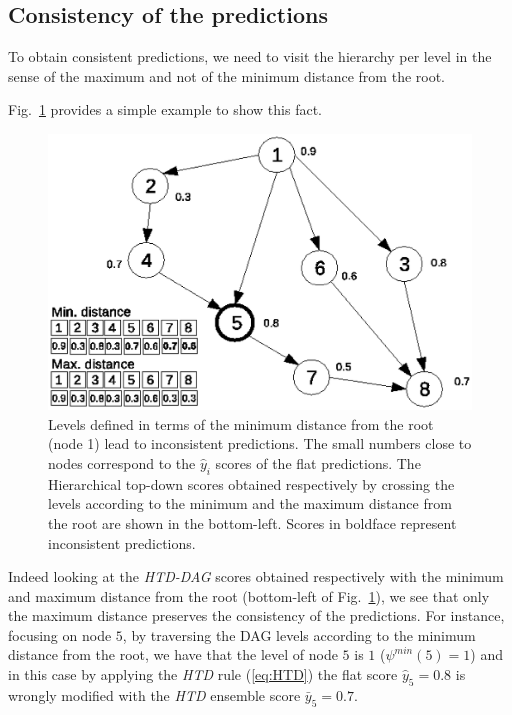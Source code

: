\documentclass{bioinfo}
\begin{document}
\begin{methods}
\subsection{Consistency of the predictions}
\label{sub:consistency}
To obtain consistent predictions, we need to visit the hierarchy per level in the sense of the maximum and not of the minimum distance from the root.

Fig.~\ref{fig:max-dist-consistency} provides a simple example to show this fact. 
\begin{figure}[!htb]
\begin{center}
\includegraphics[scale=0.5]{fig/distTCS.eps} 
\caption{Levels defined in terms of the minimum distance from the root (node 1) lead to inconsistent predictions. The small numbers close to nodes correspond to the $\hat{y}_i$ scores of the flat predictions. The Hierarchical top-down scores obtained respectively by crossing the levels according to the minimum and the maximum distance from the root are shown in the bottom-left. Scores in boldface represent inconsistent predictions.}
\label{fig:max-dist-consistency}
\end{center}
\end{figure}
Indeed looking at the {\em HTD-DAG}  scores obtained respectively with the minimum and maximum distance from the root (bottom-left of Fig.~\ref{fig:max-dist-consistency}), we see that only the maximum distance preserves the consistency of the predictions.
For instance, focusing on node $5$, by traversing the DAG levels according to the minimum distance from the root, we have that the level of node $5$ is $1$ ($\psi^{min}(5)=1$) and in this case by applying the {\em HTD} rule (\ref{eq:HTD}) the flat score $\hat{y}_5 = 0.8$ is wrongly modified with the {\em HTD} ensemble score $\bar{y}_5 = 0.7$.

\end{methods}
\end{document}
